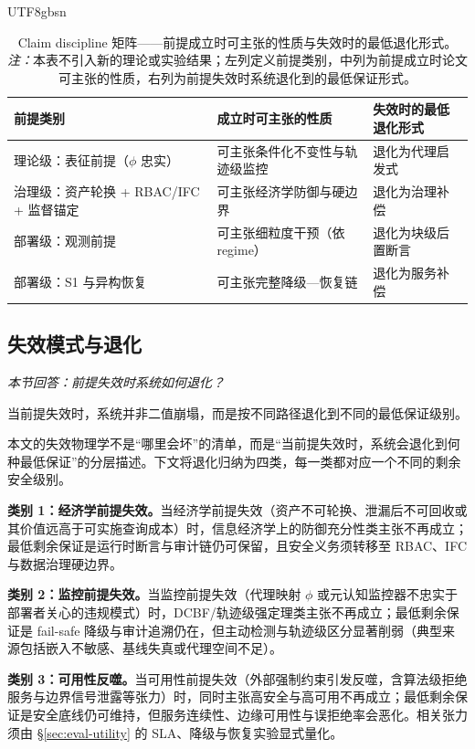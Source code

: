 \documentclass[letterpaper,twocolumn,10pt]{article}
\begin{document}
\begin{CJK}{UTF8}{gbsn}
\begin{table}[t]
\centering\small
\setlength{\tabcolsep}{4pt}
\caption[Claim discipline 矩阵]{Claim discipline 矩阵——前提成立时可主张的性质与失效时的最低退化形式。\textit{注：}本表不引入新的理论或实验结果；左列定义前提类别，中列为前提成立时论文可主张的性质，右列为前提失效时系统退化到的最低保证形式。}
\label{tab:assumption-matrix}
\begin{tabularx}{\textwidth}{@{}>{\raggedright\arraybackslash}p{2.35cm} X X@{}}
\toprule
\textbf{前提类别} & \textbf{成立时可主张的性质} & \textbf{失效时的最低退化形式} \\
\midrule
理论级：表征前提（$\phi$ 忠实） & 可主张条件化不变性与轨迹级监控 & 退化为代理启发式 \\
\addlinespace
治理级：资产轮换 + RBAC/IFC + 监督锚定 & 可主张经济学防御与硬边界 & 退化为治理补偿 \\
\addlinespace
部署级：观测前提 & 可主张细粒度干预（依 regime） & 退化为块级后置断言 \\
\addlinespace
部署级：S1 与异构恢复 & 可主张完整降级—恢复链 & 退化为服务补偿 \\
\bottomrule
\end{tabularx}
\end{table}

\subsection{失效模式与退化}
\label{sec:physics-failure}

\noindent\textit{本节回答：前提失效时系统如何退化？}

\noindent 当前提失效时，系统并非二值崩塌，而是按不同路径退化到不同的最低保证级别。

本文的失效物理学不是``哪里会坏''的清单，而是``当前提失效时，系统会退化到何种最低保证''的分层描述。下文将退化归纳为四类，每一类都对应一个不同的剩余安全级别。

\textbf{类别 1：经济学前提失效。}当经济学前提失效（资产不可轮换、泄漏后不可回收或其价值远高于可实施查询成本）时，信息经济学上的防御充分性类主张不再成立；最低剩余保证是运行时断言与审计链仍可保留，且安全义务须转移至 RBAC、IFC 与数据治理硬边界。

\textbf{类别 2：监控前提失效。}当监控前提失效（代理映射 $\phi$ 或元认知监控器不忠实于部署者关心的违规模式）时，DCBF/轨迹级强定理类主张不再成立；最低剩余保证是 fail-safe 降级与审计追溯仍在，但主动检测与轨迹级区分显著削弱（典型来源包括嵌入不敏感、基线失真或代理空间不足）。

\textbf{类别 3：可用性反噬。}当可用性前提失效（外部强制约束引发反噬，含算法级拒绝服务与边界信号泄露等张力）时，同时主张高安全与高可用不再成立；最低剩余保证是安全底线仍可维持，但服务连续性、边缘可用性与误拒绝率会恶化。相关张力须由 \S\ref{sec:eval-utility} 的 SLA、降级与恢复实验显式量化。


\end{CJK}
\end{document}
